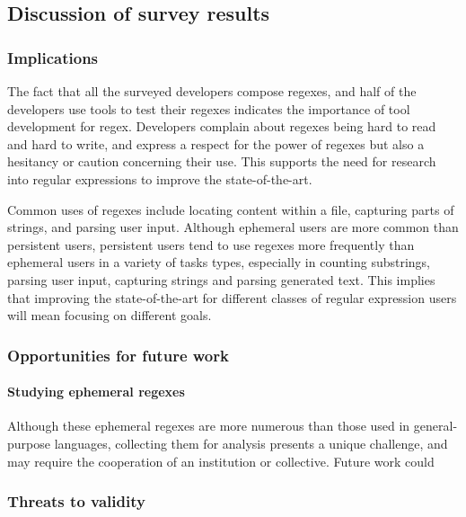 \subsection{Discussion of survey results}
\subsubsection{Implications}

The fact that all the surveyed developers compose regexes, and half of the developers use tools to test their regexes indicates the importance of tool development for regex.  Developers complain about regexes being hard to read and hard to write, and express a respect for the power of regexes but also a hesitancy or caution concerning their use.  This supports the need for research into regular expressions to improve the state-of-the-art.

Common uses of regexes include locating content within a file, capturing parts of strings, and parsing user input.  Although ephemeral users are more common than persistent users, persistent users tend to use regexes more frequently than ephemeral users in a variety of tasks types, especially in counting substrings, parsing user input, capturing strings and parsing generated text.  This implies that improving the state-of-the-art for different classes of regular expression users will mean focusing on different goals.

\subsubsection{Opportunities for future work}

\paragraph{Studying ephemeral regexes}
Although these ephemeral regexes are more numerous than those used in general-purpose languages, collecting them for analysis presents a unique challenge, and may require the cooperation of an institution or collective.  Future work could

\subsubsection{Threats to validity}




